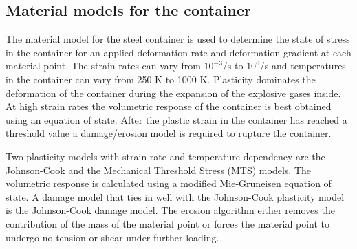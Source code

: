 \subsection{Material models for the container}
The material model for the steel container is used to determine
the state of stress in the container for an applied deformation
rate and deformation gradient at each material point.  The strain 
rates can vary from $10^{-3}$/s to $10^6$/s and temperatures in 
the container can vary from 250 K to 1000 K.  Plasticity dominates
the deformation of the container during the expansion of the 
explosive gases inside.  At high strain rates the volumetric
response of the container is best obtained using an equation of 
state.  After the plastic strain in the container
has reached a threshold value a damage/erosion model is required to
rupture the container.

Two plasticity models with strain rate and temperature dependency 
are the Johnson-Cook and the Mechanical Threshold Stress (MTS) 
models.  The volumetric response is calculated using a modified
Mie-Gruneisen equation of state.  A damage model that ties in well 
with the Johnson-Cook plasticity model is the Johnson-Cook damage 
model.  The erosion algorithm either removes the contribution
of the mass of the material point or forces the material point
to undergo no tension or shear under further loading.

